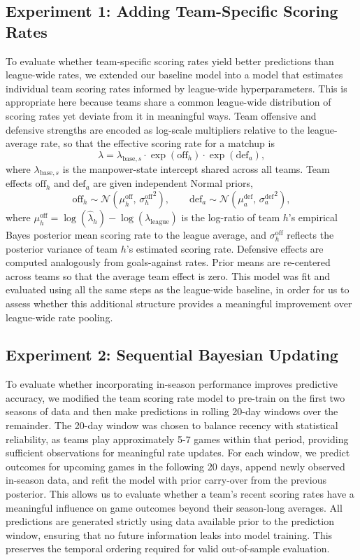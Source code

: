 \documentclass{article}
\begin{document}
\subsection{Experiment 1: Adding Team-Specific Scoring Rates}
To evaluate whether team-specific scoring rates yield better predictions than league-wide
rates, we extended our baseline model into a model that estimates individual
team scoring rates informed by league-wide hyperparameters. This is appropriate here because teams share a common league-wide distribution of scoring rates yet
deviate from it in meaningful ways. Team offensive and defensive strengths are encoded as log-scale multipliers relative to the league-average rate, so that the effective scoring rate for a matchup is
\[
\lambda = \lambda_{\text{base},s} \cdot \exp(\text{off}_h) \cdot \exp(\text{def}_a),
\]
where $\lambda_{\text{base},s}$ is the manpower-state intercept shared across all teams. Team effects $\text{off}_h$ and $\text{def}_a$ are given independent Normal priors,
\[
\text{off}_h \sim \mathcal{N}(\mu_h^{\text{off}},\, {\sigma_h^{\text{off}}}^2),
\qquad
\text{def}_a \sim \mathcal{N}(\mu_a^{\text{def}},\, {\sigma_a^{\text{def}}}^2),
\]
where $\mu_h^{\text{off}} = \log(\hat{\lambda}_h) - \log(\lambda_{\text{league}})$ is the log-ratio of
team $h$'s empirical Bayes posterior mean scoring rate to the league average, and $\sigma_h^{\text{off}}$ reflects the posterior variance of team $h$'s estimated scoring rate. Defensive effects are computed analogously from goals-against rates. Prior means are re-centered across teams so that the average team effect is zero. This model was fit and evaluated using all the same steps as the league-wide baseline, in order for us to assess whether this additional structure provides a meaningful improvement over league-wide rate pooling.

\subsection{Experiment 2: Sequential Bayesian Updating}
To evaluate whether incorporating in-season performance improves predictive accuracy, we modified the team scoring rate model to pre-train on the first two seasons of data and then make predictions in rolling 20-day windows over the remainder. The 20-day window was chosen to
balance recency with statistical reliability, as teams play approximately 5-7 games within that period, providing sufficient observations for
meaningful rate updates. For each window, we predict outcomes for upcoming games in the following 20 days, append newly observed in-season data, and refit the model with prior carry-over from the previous posterior. This allows us to evaluate whether a team's recent
scoring rates have a meaningful influence on game outcomes beyond their season-long averages. All predictions are generated strictly using data available prior to the prediction window, ensuring that no future information leaks into model training. This preserves the temporal ordering required for valid out-of-sample evaluation.
\end{document}
